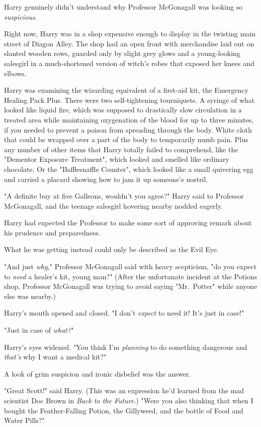 Harry genuinely didn't understand why Professor McGonagall was looking so
\emph{suspicious}.

Right now, Harry was in a shop expensive enough to display in the twisting main
street of Diagon Alley. The shop had an open front with merchandise laid out on
slanted wooden rows, guarded only by slight grey glows and a young-looking
salesgirl in a much-shortened version of witch's robes that exposed her knees
and elbows.

Harry was examining the wizarding equivalent of a first-aid kit, the Emergency
Healing Pack Plus. There were two self-tightening tourniquets. A syringe of
what looked like liquid fire, which was supposed to drastically slow
circulation in a treated area while maintaining oxygenation of the blood for up
to three minutes, if you needed to prevent a poison from spreading through the
body. White cloth that could be wrapped over a part of the body to temporarily
numb pain. Plus any number of other items that Harry totally failed to
comprehend, like the "Dementor Exposure Treatment", which looked and smelled
like ordinary chocolate. Or the "Bafflesnaffle Counter", which looked like a
small quivering egg and carried a placard showing how to jam it up someone's
nostril.

"A definite buy at five Galleons, wouldn't you agree?" Harry said to Professor
McGonagall, and the teenage salesgirl hovering nearby nodded eagerly.

Harry had expected the Professor to make some sort of approving remark about
his prudence and preparedness.

What he was getting instead could only be described as the Evil Eye.

"And just \emph{why}," Professor McGonagall said with heavy scepticism, "do you
expect to \emph{need} a healer's kit, young man?" (After the unfortunate
incident at the Potions shop, Professor McGonagall was trying to avoid saying
"Mr.~Potter" while anyone else was nearby.)

Harry's mouth opened and closed. "I don't \emph{expect} to need it! It's just
in case!"

"Just in case of \emph{what?}"

Harry's eyes widened. "You think I'm \emph{planning} to do something dangerous
and \emph{that's} why I want a medical kit?"

A look of grim suspicion and ironic disbelief was the answer.

"Great Scott!" said Harry. (This was an expression he'd learned from the mad
scientist Doc Brown in \emph{Back to the Future}.) "Were you also thinking that
when I bought the Feather-Falling Potion, the Gillyweed, and the bottle of Food
and Water Pills?"

